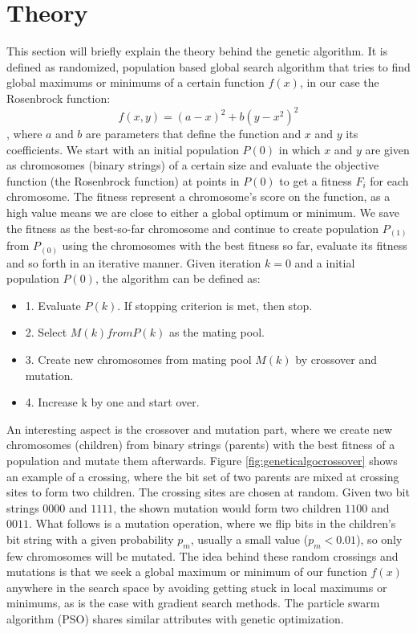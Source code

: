 \section{Theory}\label{sec:theory}

This section will briefly explain the theory behind the genetic algorithm. It is defined as randomized, population based global search algorithm that tries to find global maximums or minimums of a certain function $f(x)$, in our case the Rosenbrock function: $$f(x,y) = (a-x)^2+b(y-x^2)^2$$, where $a$ and $b$ are parameters that define the function and $x$ and $y$ its coefficients. We start with an initial population $P(0)$ in which $x$ and $y$ are given as chromosomes (binary strings) of a certain size and evaluate the objective function (the Rosenbrock function\cite{Shang2006}) at points in $P(0)$ to get a fitness $F_{i}$ for each chromosome. The fitness represent a chromosome's score on the function, as a high value means we are close to either a global optimum or minimum. We save the fitness as the best-so-far chromosome and continue to create population $P_(1)$ from $P_(0)$ using the chromosomes with the best fitness so far, evaluate its fitness and so forth in an iterative manner. Given iteration $k=0$ and a initial population $P(0)$, the algorithm can be defined as\cite{Chong2013}:

\begin{itemize}
	\item 1. Evaluate $P(k)$. If stopping criterion is met, then stop.
	\item 2. Select $M(k) from P(k)$ as the mating pool.
	\item 3. Create new chromosomes from mating pool $M(k)$ by crossover and mutation.
	\item 4. Increase k by one and start over.
\end{itemize}

An interesting aspect is the crossover and mutation part, where we create new chromosomes (children) from binary strings (parents) with the best fitness of a population and mutate them afterwards. Figure \ref{fig:geneticalgocrossover} shows an example of a crossing, where the bit set of two parents are mixed at crossing sites to form two children. The crossing sites are chosen at random. Given two bit strings $0000$ and $1111$, the shown mutation would form two children $1100$ and $0011$. What follows is a mutation operation, where we flip bits in the children's bit string with a given probability $p_{m}$, usually a small value ($p_{m} < 0.01$), so only few chromosomes will be mutated. The idea behind these random crossings and mutations is that we seek a global maximum or minimum of our function $f(x)$ anywhere in the search space by avoiding getting stuck in local maximums or minimums, as is the case with gradient search methods. The particle swarm algorithm (PSO) shares similar attributes with genetic optimization.

